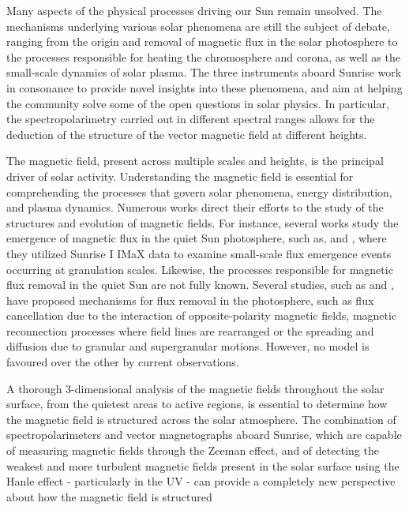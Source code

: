 Many aspects of the physical processes driving our Sun remain unsolved. The mechanisms underlying various solar phenomena are still the subject of debate, ranging from the origin and removal of magnetic flux in the solar photosphere to the processes responsible for heating the chromosphere and corona, as well as the small-scale dynamics of solar plasma. The three instruments aboard Sunrise work in consonance to provide novel insights into these phenomena, and aim at helping the community solve some of the open questions in solar physics. In particular, the spectropolarimetry carried out in different spectral ranges allows for the deduction of the structure of the vector magnetic field at different heights. 

The magnetic field, present across multiple scales and heights, is the principal driver of solar activity. Understanding the magnetic field is essential for comprehending the processes that govern solar phenomena, energy distribution, and plasma dynamics. Numerous works direct their efforts to the study of the structures and evolution of magnetic fields. For instance, several works study  the emergence of magnetic flux in the quiet Sun photosphere, such as, \cite{flux_emergence_1} and \cite{flux_emergence_2}, where they utilized Sunrise I IMaX data to examine small-scale flux emergence events occurring at granulation scales. Likewise, the processes responsible for magnetic flux removal in the quiet Sun are not fully known. Several studies, such as \cite{flux_removal_1} and \cite{flux_emergence_2}, have proposed mechanisms for flux removal in the photosphere, such as flux cancellation due to the interaction of opposite-polarity magnetic fields, magnetic reconnection processes where field lines are rearranged or the spreading and diffusion due to granular and supergranular motions. However, no model is favoured over the other by current observations.

A thorough 3-dimensional analysis of the magnetic fields throughout the solar surface, from the quietest areas to active regions, is essential to determine how the magnetic field is structured across the solar atmosphere. The combination of spectropolarimeters and vector magnetographs aboard Sunrise, which are capable of measuring magnetic fields through the Zeeman effect, and of detecting the weakest and more turbulent \citep{quiet_sun_living_review} magnetic fields present in the solar surface using the Hanle effect - particularly in the UV - can provide a completely new perspective about how the magnetic field is structured 

